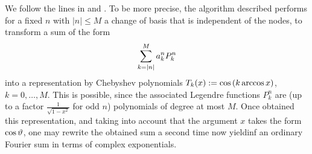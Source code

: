 We follow the lines in \cite{postta97} and \cite{kupo02}. To be more precise, the algorithm described 
performs for a fixed $n$ with $|n| \le M$ a change of basis that is independent of the nodes, to 
transform a sum of the form
\begin{equation}
  \label{NFSFT:LegendreSum}
  \sum_{k=\left\vert n\right\vert}^M a_{k}^n P_{k}^n
\end{equation}
into a representation by Chebyshev polynomials $T_{k}{\hspace{-0.4ex}}\left(x\right) := \cos{\hspace{-0.4ex}}\left(k \arccos x\right)$, $k=0,\ldots,M$. 
This is possible, since the associated Legendre functions $P_{k}^n$ are (up to a factor $\frac{1}{\sqrt{1-x^2}}$ 
for odd $n$) polynomials of degree at most $M$. Once obtained this representation, and taking into account 
that the argument $x$ takes the form $\cos \vartheta$, one may rewrite the obtained sum a second time now yieldinf
an ordinary Fourier sum in terms of complex exponentials.

